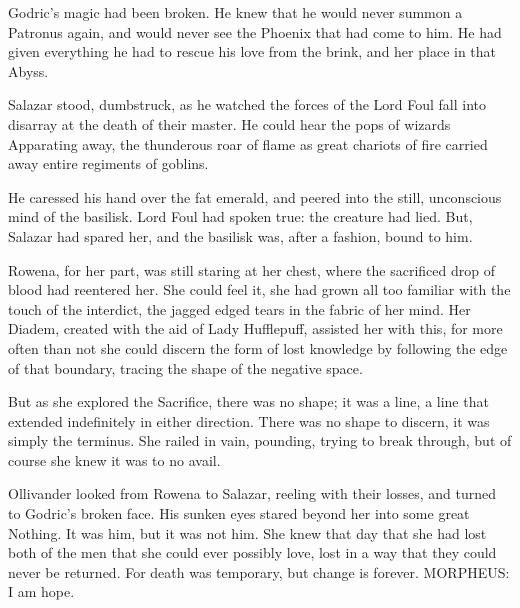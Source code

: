 Godric’s magic had been broken. He knew that he would never summon a Patronus again, and would never see the Phoenix that had come to him. He had given everything he had to rescue his love from the brink, and her place in that Abyss.

Salazar stood, dumbstruck, as he watched the forces of the Lord Foul fall into disarray at the death of their master. He could hear the pops of wizards Apparating away, the thunderous roar of flame as great chariots of fire carried away entire regiments of goblins.

He caressed his hand over the fat emerald, and peered into the still, unconscious mind of the basilisk. Lord Foul had spoken true: the creature had lied. But, Salazar had spared her, and the basilisk was, after a fashion, bound to him.

Rowena, for her part, was still staring at her chest, where the sacrificed drop of blood had reentered her. She could feel it, she had grown all too familiar with the touch of the interdict, the jagged edged tears in the fabric of her mind. Her Diadem, created with the aid of Lady Hufflepuff, assisted her with this, for more often than not she could discern the form of lost knowledge by following the edge of that boundary, tracing the shape of the negative space.

But as she explored the Sacrifice, there was no shape; it was a line, a line that extended indefinitely in either direction. There was no shape to discern, it was simply the terminus. She railed in vain, pounding, trying to break through, but of course she knew it was to no avail.

Ollivander looked from Rowena to Salazar, reeling with their losses, and turned to Godric’s broken face. His sunken eyes stared beyond her into some great Nothing. It was him, but it was not him.
\SmallVSpace
She knew that day that she had lost both of the men that she could ever possibly love, lost in a way that they could never be returned. For death was temporary, but change is forever.
\simpleline
MORPHEUS: I am hope.